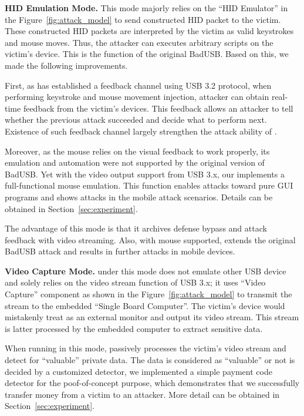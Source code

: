 \textbf{HID Emulation Mode.} This mode majorly relies on the ``HID Emulator'' in the Figure~\ref{fig:attack_model} to
send constructed HID packet to the victim. These constructed HID packets are
interpreted by the victim as valid keystrokes and mouse moves. Thus, the
attacker can executes arbitrary scripts on the victim's device. This is the
function of the original BadUSB. Based on this, we made the following
improvements.

First, as \tool has established a feedback channel using USB 3.2 protocol, when performing keystroke and mouse movement injection, attacker can obtain real-time feedback from the victim's devices. This feedback allows an attacker to tell whether the previous attack succeeded and decide what to perform next. Existence of such feedback channel largely strengthen the attack ability of \tool.

Moreover, as the mouse relies on the visual feedback to work properly, its
emulation and automation were not supported by the original version of BadUSB.
Yet with the video output support from USB 3.x, our \tool implements a
full-functional mouse emulation. This function enables attacks toward pure GUI
programs and shows attacks in the mobile attack scenarios. Details can
be obtained in Section~\ref{sec:experiment}.

The advantage of this mode is that it archives defense bypass and attack
feedback with video streaming.  
Also, with mouse
supported, \tool extends the original BadUSB attack and results in further attacks in
mobile devices.

\textbf{Video Capture Mode.} \tool under this mode does not emulate other
USB device and solely relies on the video stream function of USB 3.x; it uses
``Video Capture'' component as shown in the Figure~\ref{fig:attack_model} to transmit the stream to the embedded ``Single Board Computer''.
The victim's device would mistakenly treat \tool as an external monitor
and output its video stream. This stream is latter processed by the embedded
computer to extract sensitive data.

When running in this mode, \tool passively processes the victim's video stream
and detect for ``valuable'' private data.  The data is considered as
``valuable'' or not is decided by a customized detector, we implemented a simple
payment code detector for the poof-of-concept purpose, which demonstrates that we successfully transfer money from a victim to an
attacker. More detail can be obtained in Section~\ref{sec:experiment}.

